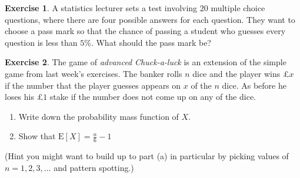 \documentclass[
]{book}
\theoremstyle{definition}
\theoremstyle{definition}
\theoremstyle{definition}
\newtheorem{exercise}{Exercise}[chapter]
\theoremstyle{definition}
\theoremstyle{remark}
\begin{document}
\begin{exercise}
A statistics lecturer sets a test involving \(20\) multiple choice questions, where there are four possible answers for each question. They want to choose a pass mark so that the chance of passing a student who guesses every question is less than \(5\%\). What should the pass mark be?
\end{exercise}

\begin{exercise}
The game of \emph{advanced Chuck-a-luck} is an extension of the simple game from last week's exercises. The banker rolls \(n\) dice and the player wins £\(x\) if the number that the player guesses appears on \(x\) of the \(n\) dice. As before he loses his £\(1\) stake if the number does not come up on any of the dice.

\begin{enumerate}
\def\labelenumi{\alph{enumi})}
\item
  Write down the probability mass function of \(X\).
\item
  Show that \(\text{E}[X] = \frac{n}{6} - 1\)
\end{enumerate}

(Hint you might want to build up to part (a) in particular by picking values of \(n=1,2,3,\dots\) and pattern spotting.)
\end{exercise}
\end{document}
